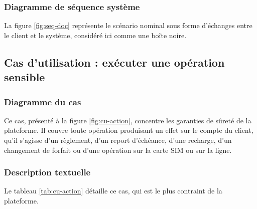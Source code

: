 \subsubsection{Diagramme de séquence système}

La figure \ref{fig:seq-doc} représente le scénario nominal sous forme d'échanges entre le client et le système, considéré ici comme une boîte noire.


\subsection{Cas d'utilisation : exécuter une opération sensible}

\subsubsection{Diagramme du cas}

Ce cas, présenté à la figure \ref{fig:cu-action}, concentre les garanties de sûreté de la plateforme. Il couvre toute opération produisant un effet sur le compte du client, qu'il s'agisse d'un règlement, d'un report d'échéance, d'une recharge, d'un changement de forfait ou d'une opération sur la carte SIM ou sur la ligne.


\subsubsection{Description textuelle}

Le tableau \ref{tab:cu-action} détaille ce cas, qui est le plus contraint de la plateforme.

